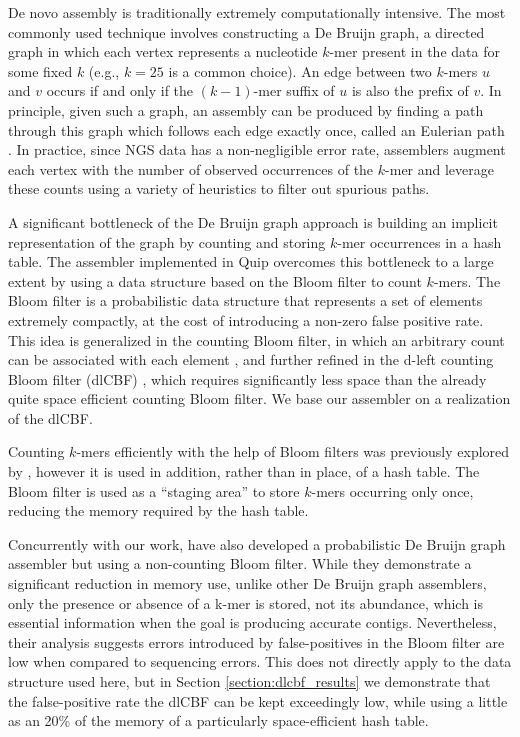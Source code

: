 \documentclass[twocolumn]{article}
\begin{document}
De novo assembly is traditionally extremely computationally intensive. The
most commonly used technique involves constructing a De Bruijn graph, a
directed graph in which each vertex represents a nucleotide $k$-mer present in
the data for some fixed $k$ (e.g., $k = 25$ is a common choice). An edge
between two $k$-mers $u$ and $v$ occurs if and only if the $(k-1)$-mer suffix
of $u$ is also the prefix of $v$. In principle, given such a graph, an
assembly can be produced by finding a path through this graph which follows
each edge exactly once, called an Eulerian path \citep{Pevzner2001}. In
practice, since NGS data has a non-negligible error rate, assemblers augment
each vertex with the number of observed occurrences of the $k$-mer and
leverage these counts using a variety of heuristics to filter out spurious
paths.

A significant bottleneck of the De Bruijn graph approach is building an
implicit representation of the graph by counting and storing $k$-mer
occurrences in a hash table. The assembler implemented in Quip overcomes this
bottleneck to a large extent by using a data structure based on the Bloom
filter to count $k$-mers. The Bloom filter \citep{Bloom1970} is a
probabilistic data structure that represents a set of elements extremely
compactly, at the cost of introducing a non-zero false positive rate. This
idea is generalized in the counting Bloom filter, in which an arbitrary count
can be associated with each element \citep{Fan2000}, and further refined in
the d-left counting Bloom filter (dlCBF) \citep{Bonomi2006}, which requires
significantly less space than the already quite space efficient counting Bloom
filter. We base our assembler on a realization of the dlCBF.

Counting $k$-mers efficiently with the help of Bloom filters was previously
explored by \citet{Melsted2011}, however it is used in addition, rather than
in place, of a hash table. The Bloom filter is used as a ``staging area'' to
store $k$-mers occurring only once, reducing the memory required by the hash
table. 

Concurrently with our work, \citet{Pell2011} have also developed a
probabilistic De Bruijn graph assembler but using a non-counting Bloom
filter. While they demonstrate a significant reduction in memory use, unlike
other De Bruijn graph assemblers, only the presence or absence of a k-mer is
stored, not its abundance, which is essential information when the goal is
producing accurate contigs. Nevertheless, their analysis suggests errors
introduced by false-positives in the Bloom filter are low when compared to
sequencing errors. This does not directly apply to the data structure used
here, but in Section \ref{section:dlcbf_results} we demonstrate that the
false-positive rate the dlCBF can be kept exceedingly low, while using a
little as an 20\% of the memory of a particularly space-efficient hash table.
\end{document}
